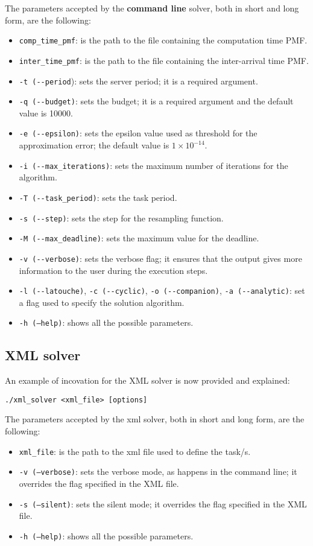 The parameters accepted by the \textbf{command line} solver, both in short and long form, are the following:
\begin{itemize}
  \item \texttt{comp\_time\_pmf}: is the path to the file containing the computation time PMF.
  \item \texttt{inter\_time\_pmf}: is the path to the file containing the inter-arrival time PMF.
  \item \texttt{-t (-{}-period}): sets the server period; it is a required argument.
  \item \texttt{-q (-{}-budget)}: sets the budget; it is a required argument and the default value is 10000.
  \item \texttt{-e (-{}-epsilon)}: sets the epsilon value used as threshold for the approximation error; the default value is \( 1 \times 10^{-14} \).
  \item \texttt{-i (-{}-max\_iterations)}: sets the maximum number of iterations for the algorithm.
  \item \texttt{-T (-{}-task\_period)}: sets the task period.
  \item \texttt{-s (-{}-step)}: sets the step for the resampling function.
  \item \texttt{-M (-{}-max\_deadline)}: sets the maximum value for the deadline.
  \item \texttt{-v (-{}-verbose)}: sets the verbose flag; it ensures that the output gives more information to the user during the execution steps.
  \item \texttt{-l (-{}-latouche)}, \texttt{-c (-{}-cyclic)}, \texttt{-o (-{}-companion)}, \texttt{-a (-{}-analytic)}: set a flag used to specify the solution algorithm. 
  \item \texttt{-h (--help)}: shows all the possible parameters.
\end{itemize}
 
\subsection{XML solver}
An example of incovation for the XML solver is now provided and explained:
\begin{lstlisting}[frame=bt, numbers=none]
  ./xml_solver <xml_file> [options]
\end{lstlisting}

The parameters accepted by the xml solver, both in short and long form, are the following:
\begin{itemize}
  \item \texttt{xml\_file}: is the path to the xml file used to define the task/s.
  \item \texttt{-v (--verbose)}: sets the verbose mode, as happens in the command line; it overrides the flag specified in the XML file.
  \item \texttt{-s (--silent)}: sets the silent mode; it overrides the flag specified in the XML file.
  \item \texttt{-h (--help)}: shows all the possible parameters.
\end{itemize}

